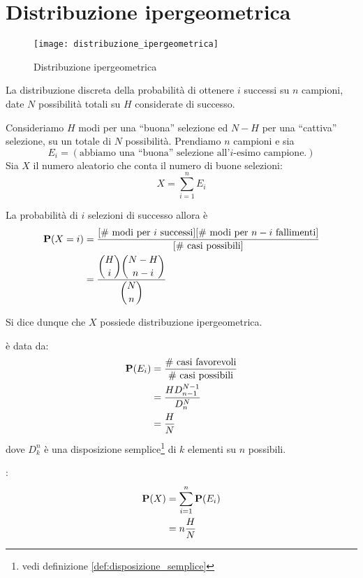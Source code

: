 \section{Distribuzione ipergeometrica} %
\begin{figure*}
  \texttt{[image: distribuzione\_ipergeometrica]}
  \caption{Distribuzione ipergeometrica} 
\end{figure*}

\begin{definition}
  \label{def:distribuzione_ipergeometrica}
  La distribuzione discreta della probabilità di ottenere \( i \) successi su \( n \) campioni, date \( N \) possibilità totali su \( H \) considerate di successo.
\end{definition}
Consideriamo \( H \) modi per una ``buona'' selezione ed \( N - H \) per una ``cattiva'' selezione, su un totale di \( N \) possibilità.
Prendiamo \( n \) campioni e sia
\[ E_i = (\text{abbiamo una ``buona'' selezione all'}i\text{-esimo campione.}) \]
Sia \( X \) il numero aleatorio che conta il numero di buone selezioni:
\[
  X = \sum_{i = 1}^n E_i
\]

La probabilità di \( i \) selezioni di successo allora è
\begin{align*}
  \mathbf{P}(X = i) &= \frac{[\text{\# modi per }i\text{ successi}][\text{\# modi per }n - i\text{ fallimenti}]}{[\text{\# casi possibili}]} \\
  &= \frac{\displaystyle \binom{H}{i} \binom{N-H}{n-i}}{\displaystyle \binom{N}{n}}
\end{align*}

Si dice dunque che \( X \) possiede distribuzione ipergeometrica.

 è data da:
\begin{align*}
  \mathbf{P}(E_i) &= \frac{\text{\# casi favorevoli}}{\text{\# casi possibili}} \\
  &= \frac{H D_{n-1}^{N-1}}{D_n^N} \\
  &= \frac{H}{N}
\end{align*}
dove \( D_k^n \) è una disposizione semplice\footnote{vedi definizione \ref{def:disposizione_semplice}} di \( k \) elementi su \( n \) possibili.

:
\begin{align*}
  \mathbf{P}(X) &= \sum_{i=1}^n \mathbf{P}(E_i) \\
  &= n \frac{H}{N}
\end{align*}

